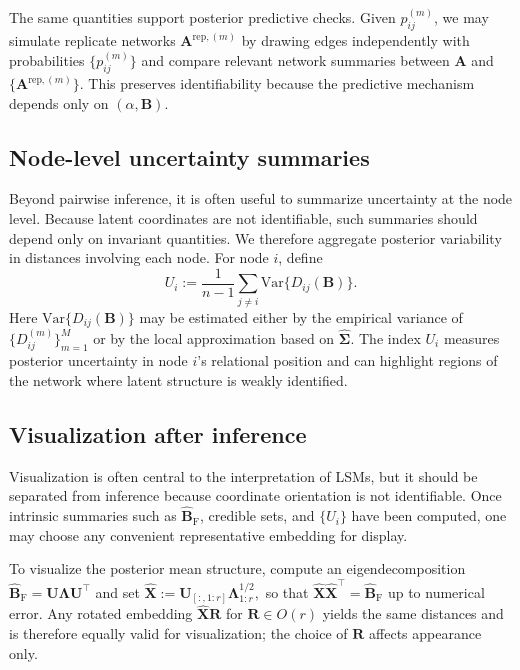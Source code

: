 \documentclass[12pt]{article}
\newcommand{\bfA}{\boldsymbol{A}}
\newcommand{\bfB}{\boldsymbol{B}}
\newcommand{\bfR}{\boldsymbol{R}}
\newcommand{\bfU}{\boldsymbol{U}}
\newcommand{\bfX}{\boldsymbol{X}}
\newcommand{\bfLambda}{\boldsymbol{\Lambda}}
\newcommand{\bfSigma}{\boldsymbol{\Sigma}}
\newcommand{\BhatF}{\widehat{\bfB}_{\mathrm{F}}}
\begin{document}
The same quantities support posterior predictive checks. Given $p_{ij}^{(m)}$, we may simulate
replicate networks $\bfA^{\mathrm{rep},(m)}$ by drawing edges independently with probabilities
$\{p_{ij}^{(m)}\}$ and compare relevant network summaries between $\bfA$ and
$\{\bfA^{\mathrm{rep},(m)}\}$. This preserves identifiability because the predictive mechanism
depends only on $(\alpha,\bfB)$.

\subsection{Node-level uncertainty summaries}\label{subsec:node-uncert}

Beyond pairwise inference, it is often useful to summarize uncertainty at the node level. Because
latent coordinates are not identifiable, such summaries should depend only on invariant quantities.
We therefore aggregate posterior variability in distances involving each node. For node $i$, define
\begin{equation}\label{eq:Ui}
U_i := \frac{1}{n-1}\sum_{j\neq i}\mathrm{Var}\{D_{ij}(\bfB)\}.
\end{equation}
Here $\mathrm{Var}\{D_{ij}(\bfB)\}$ may be estimated either by the empirical variance of
$\{D_{ij}^{(m)}\}_{m=1}^M$ or by the local approximation based on $\widehat{\bfSigma}$. The index
$U_i$ measures posterior uncertainty in node $i$'s relational position and can highlight regions of
the network where latent structure is weakly identified.

\subsection{Visualization after inference}\label{subsec:viz}

Visualization is often central to the interpretation of LSMs, but it should be separated from
inference because coordinate orientation is not identifiable. Once intrinsic summaries such as
$\BhatF$, credible sets, and $\{U_i\}$ have been computed, one may choose any convenient
representative embedding for display.

To visualize the posterior mean structure, compute an eigendecomposition
$\BhatF=\bfU\bfLambda\bfU^\top$ and set
$
\hat{\bfX}:=\bfU_{[:,1:r]}\bfLambda_{1:r}^{1/2},
$
so that $\hat{\bfX}\hat{\bfX}^\top=\BhatF$ up to numerical error. Any rotated embedding
$\hat{\bfX}\bfR$ for $\bfR\in O(r)$ yields the same distances and is therefore equally valid for
visualization; the choice of $\bfR$ affects appearance only.
\end{document}
